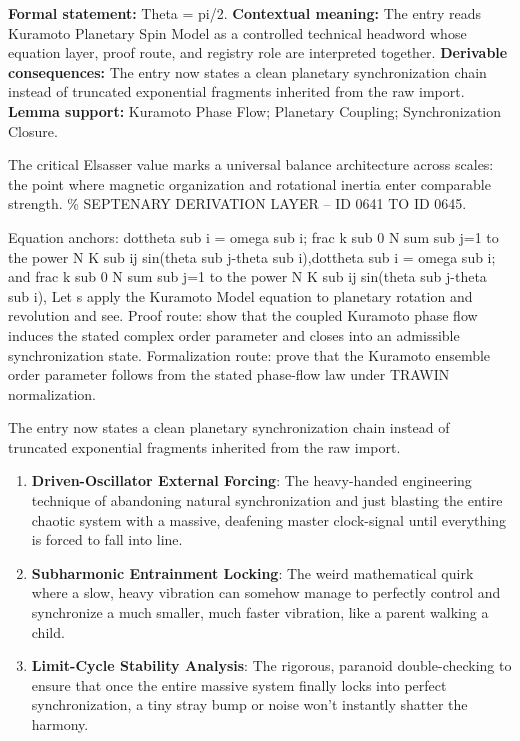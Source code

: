 \begingroup\footnotesize\setlength{\emergencystretch}{3em}\sloppy
\textbf{Formal statement:} Theta = pi/2. \textbf{Contextual meaning:} The entry reads Kuramoto Planetary Spin Model as a controlled technical headword whose equation layer, proof route, and registry role are interpreted together. \textbf{Derivable consequences:} The entry now states a clean planetary synchronization chain instead of truncated exponential fragments inherited from the raw import. \textbf{Lemma support:} Kuramoto Phase Flow; Planetary Coupling; Synchronization Closure.\par
\endgroup

The critical Elsasser value marks a universal balance architecture across scales: the point where magnetic organization and rotational inertia enter comparable strength. \% SEPTENARY DERIVATION LAYER -- ID 0641 TO ID 0645.

Equation anchors: dottheta sub i = omega sub i; frac k sub 0 N sum sub j=1 to the power N K sub ij sin(theta sub j-theta sub i),dottheta sub i = omega sub i; and frac k sub 0 N sum sub j=1 to the power N K sub ij sin(theta sub j-theta sub i), Let s apply the Kuramoto Model equation to planetary rotation and revolution and see. Proof route: show that the coupled Kuramoto phase flow induces the stated complex order parameter and closes into an admissible synchronization state. Formalization route: prove that the Kuramoto ensemble order parameter follows from the stated phase-flow law under TRAWIN normalization.

The entry now states a clean planetary synchronization chain instead of truncated exponential fragments inherited from the raw import.
\endgroup

\begin{enumerate}[leftmargin=1.6em,itemsep=6pt,topsep=4pt]
\item \textbf{Driven-Oscillator External Forcing}: The heavy-handed engineering technique of abandoning natural synchronization and just blasting the entire chaotic system with a massive, deafening master clock-signal until everything is forced to fall into line.
\item \textbf{Subharmonic Entrainment Locking}: The weird mathematical quirk where a slow, heavy vibration can somehow manage to perfectly control and synchronize a much smaller, much faster vibration, like a parent walking a child.
\item \textbf{Limit-Cycle Stability Analysis}: The rigorous, paranoid double-checking to ensure that once the entire massive system finally locks into perfect synchronization, a tiny stray bump or noise won't instantly shatter the harmony.
\end{enumerate}

